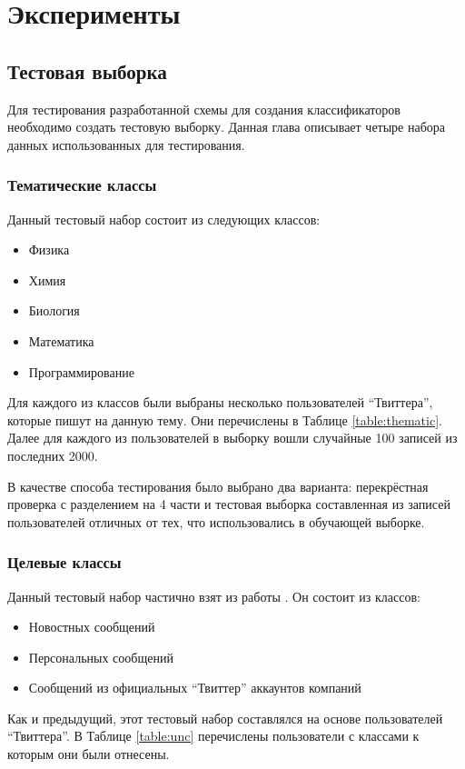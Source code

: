 \chapter{Эксперименты}
\label{chap:experiments}

\section{Тестовая выборка}
Для тестирования разработанной схемы для создания классификаторов необходимо создать тестовую выборку. Данная глава описывает четыре набора данных использованных для тестирования.

\subsection{Тематические классы}
Данный тестовый набор состоит из следующих классов:
\begin{itemize}
\item Физика
\item Химия
\item Биология
\item Математика
\item Программирование
\end{itemize}

Для каждого из классов были выбраны несколько пользователей ``Твиттера'', которые пишут на данную тему. Они перечислены в Таблице \ref{table:thematic}. Далее для каждого из пользователей в выборку вошли случайные 100 записей из последних 2000.

В качестве способа тестирования было выбрано два варианта: перекрёстная проверка с разделением на 4 части и тестовая выборка составленная из записей пользователей отличных от тех, что использовались в обучающей выборке.

\subsection{Целевые классы}

Данный тестовый набор частично взят из работы \cite{Horn_2010}. Он состоит из классов:
\begin{itemize}
\item Новостных сообщений
\item Персональных сообщений
\item Сообщений из официальных ``Твиттер'' аккаунтов компаний
\end{itemize}

Как и предыдущий, этот тестовый набор составлялся на основе пользователей ``Твиттера''. В Таблице \ref{table:unc} перечислены пользователи с классами к которым они были отнесены.

